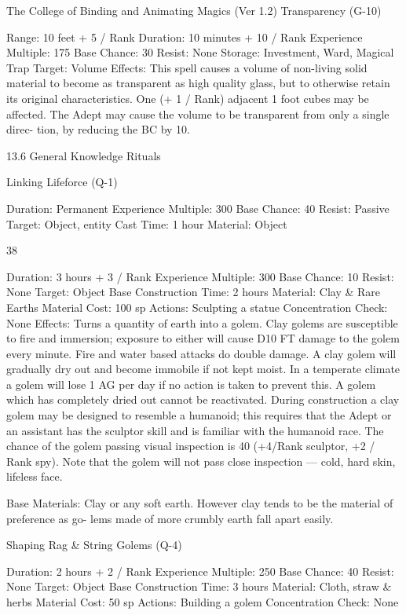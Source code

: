 \begin{Chapter}{The College of Binding and Animating Magics (Ver 1.2)}
Transparency (G-10) 

Range: 10 feet + 5 / Rank 
Duration: 10 minutes + 10 / Rank 
Experience Multiple: 175 
Base Chance: 30%
Resist: None 
Storage: Investment, Ward, Magical Trap 
Target: Volume 
Effects:  This  spell  causes  a  volume  of  non-living 
solid  material  to  become  as  transparent  as  high 
quality  glass,  but  to  otherwise  retain  its  original 
characteristics.  One  (+  1  /  Rank)  adjacent  1  foot 
cubes  may  be  affected.  The  Adept  may  cause  the 
volume to be transparent from only a single direc-
tion, by reducing the BC by 10. 

13.6 General Knowledge Rituals 

Linking Lifeforce (Q-1) 

Duration: Permanent 
Experience Multiple: 300 
Base Chance: 40%
Resist: Passive 
Target: Object, entity 
Cast Time: 1 hour 
Material: Object 

38 

Duration: 3 hours + 3 / Rank 
Experience Multiple: 300 
Base Chance: 10%
Resist: None 
Target: Object 
Base Construction Time: 2 hours 
Material:  Clay  \&  Rare  Earths  Material  Cost:  100 
sp 
Actions: Sculpting a statue 
Concentration Check: None 
Effects:  Turns  a  quantity  of  earth  into  a  golem. 
Clay golems are susceptible to fire and immersion; 
exposure  to  either  will  cause  D10  FT  damage  to 
the  golem  every  minute.  Fire  and  water  based 
attacks  do  double  damage.  A  clay  golem  will 
gradually dry out and become immobile if not kept 
moist.  In  a  temperate  climate  a  golem  will  lose  1 
AG per day if no action is taken to prevent this. A 
golem  which  has  completely  dried  out  cannot  be 
reactivated. During construction a clay golem may 
be  designed to  resemble  a  humanoid;  this  requires 
that the Adept or an assistant has the sculptor skill 
and is familiar with the humanoid race. The chance 
of  the  golem  passing  visual  inspection  is  40%
(+4/Rank  sculptor,  +2  /  Rank  spy).  Note  that  the 
golem will  not pass  close  inspection —  cold, hard 
skin, lifeless face. 

Base  Materials:  Clay  or  any  soft  earth.  However 
clay  tends  to  be  the  material  of  preference  as  go-
lems made of more crumbly earth fall apart easily. 

Shaping Rag \& String Golems (Q-4) 

Duration: 2 hours + 2 / Rank 
Experience Multiple: 250 
Base Chance: 40%
Resist: None 
Target: Object 
Base Construction Time: 3 hours 
Material: Cloth, straw \& herbs  
Material Cost: 50 sp 
Actions: Building a golem 
Concentration Check: None 


\end{Chapter}
